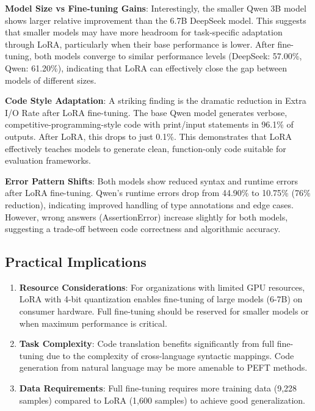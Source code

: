 \documentclass[conference]{IEEEtran}
\begin{document}
\textbf{Model Size vs Fine-tuning Gains}: Interestingly, the smaller Qwen 3B model shows larger relative improvement than the 6.7B DeepSeek model. This suggests that smaller models may have more headroom for task-specific adaptation through LoRA, particularly when their base performance is lower. After fine-tuning, both models converge to similar performance levels (DeepSeek: 57.00\%, Qwen: 61.20\%), indicating that LoRA can effectively close the gap between models of different sizes.

\textbf{Code Style Adaptation}: A striking finding is the dramatic reduction in Extra I/O Rate after LoRA fine-tuning. The base Qwen model generates verbose, competitive-programming-style code with print/input statements in 96.1\% of outputs. After LoRA, this drops to just 0.1\%. This demonstrates that LoRA effectively teaches models to generate clean, function-only code suitable for evaluation frameworks.

\textbf{Error Pattern Shifts}: Both models show reduced syntax and runtime errors after LoRA fine-tuning. Qwen's runtime errors drop from 44.90\% to 10.75\% (76\% reduction), indicating improved handling of type annotations and edge cases. However, wrong answers (AssertionError) increase slightly for both models, suggesting a trade-off between code correctness and algorithmic accuracy.

\subsection{Practical Implications}

\begin{enumerate}
    \item \textbf{Resource Considerations}: For organizations with limited GPU resources, LoRA with 4-bit quantization enables fine-tuning of large models (6-7B) on consumer hardware. Full fine-tuning should be reserved for smaller models or when maximum performance is critical.
    
    \item \textbf{Task Complexity}: Code translation benefits significantly from full fine-tuning due to the complexity of cross-language syntactic mappings. Code generation from natural language may be more amenable to PEFT methods.
    
    \item \textbf{Data Requirements}: Full fine-tuning requires more training data (9,228 samples) compared to LoRA (1,600 samples) to achieve good generalization.
\end{enumerate}
\end{document}
